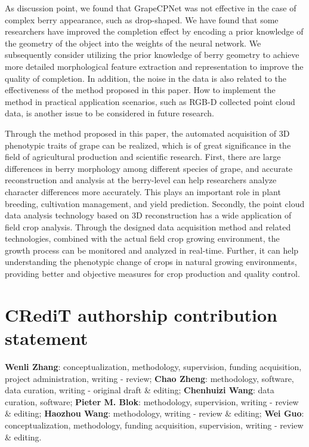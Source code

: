 \documentclass[12pt]{article}
\begin{document}
As discussion point, we found that GrapeCPNet was not effective in the case of complex berry appearance, such as drop-shaped. 
We have found that some researchers \citep{pan_panoptic_2023,magistri_efficient_2024} have improved the completion effect by encoding a prior knowledge of the geometry of the object into the weights of the neural network. 
We subsequently consider utilizing the prior knowledge of berry geometry to achieve more detailed morphological feature extraction and representation to improve the quality of completion. 
In addition, the noise in the data is also related to the effectiveness of the method proposed in this paper. 
How to implement the method in practical application scenarios, such as RGB-D collected point cloud data, is another issue to be considered in future research. 

Through the method proposed in this paper, the automated acquisition of 3D phenotypic traits of grape can be realized, which is of great significance in the field of agricultural production and scientific research. 
First, there are large differences in berry morphology among different species of grape, and accurate reconstruction and analysis at the berry-level can help researchers analyze character differences more accurately. 
This plays an important role in plant breeding, cultivation management, and yield prediction. 
Secondly, the point cloud data analysis technology based on 3D reconstruction has a wide application of field crop analysis. 
Through the designed data acquisition method and related technologies, combined with the actual field crop growing environment, the growth process can be monitored and analyzed in real-time. 
Further, it can help understanding the phenotypic change of crops in natural growing environments, providing better and objective measures for crop production and quality control. 


\section*{CRediT authorship contribution statement}
\textbf{Wenli Zhang}: conceptualization, methodology, supervision, funding acquisition, project administration, writing - review; \textbf{Chao Zheng}: methodology, software, data curation, writing - original draft \& editing; \textbf{Chenhuizi Wang}: data curation, software; \textbf{Pieter M. Blok}: methodology, supervision, writing - review \& editing; \textbf{Haozhou Wang}: methodology, writing - review \& editing; \textbf{Wei Guo}: conceptualization, methodology, funding acquisition, supervision, writing - review \& editing.
\end{document}
